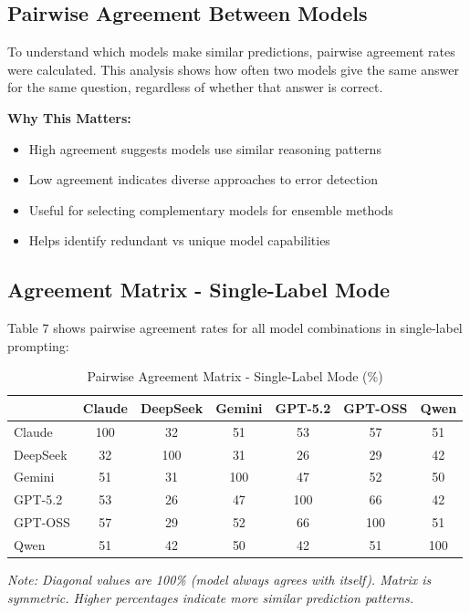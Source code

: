 \documentclass[12pt,a4paper]{article}
\begin{document}
\subsection{Pairwise Agreement Between Models}

To understand which models make similar predictions, pairwise agreement rates were calculated. This analysis shows how often two models give the same answer for the same question, regardless of whether that answer is correct.

\textbf{Why This Matters:}
\begin{itemize}[leftmargin=*]
    \item High agreement suggests models use similar reasoning patterns
    \item Low agreement indicates diverse approaches to error detection
    \item Useful for selecting complementary models for ensemble methods
    \item Helps identify redundant vs unique model capabilities
\end{itemize}

\subsection{Agreement Matrix - Single-Label Mode}

Table 7 shows pairwise agreement rates for all model combinations in single-label prompting:

\begin{table}[H]
\centering
\begin{tabular}{lcccccc}
\toprule
 & \textbf{Claude} & \textbf{DeepSeek} & \textbf{Gemini} & \textbf{GPT-5.2} & \textbf{GPT-OSS} & \textbf{Qwen} \\
\midrule
Claude & 100 & 32 & 51 & 53 & 57 & 51 \\
DeepSeek & 32 & 100 & 31 & 26 & 29 & 42 \\
Gemini & 51 & 31 & 100 & 47 & 52 & 50 \\
GPT-5.2 & 53 & 26 & 47 & 100 & 66 & 42 \\
GPT-OSS & 57 & 29 & 52 & 66 & 100 & 51 \\
Qwen & 51 & 42 & 50 & 42 & 51 & 100 \\
\bottomrule
\end{tabular}
\caption{Pairwise Agreement Matrix - Single-Label Mode (\%)}
\end{table}

\textit{Note: Diagonal values are 100\% (model always agrees with itself). Matrix is symmetric. Higher percentages indicate more similar prediction patterns.}
\end{document}
